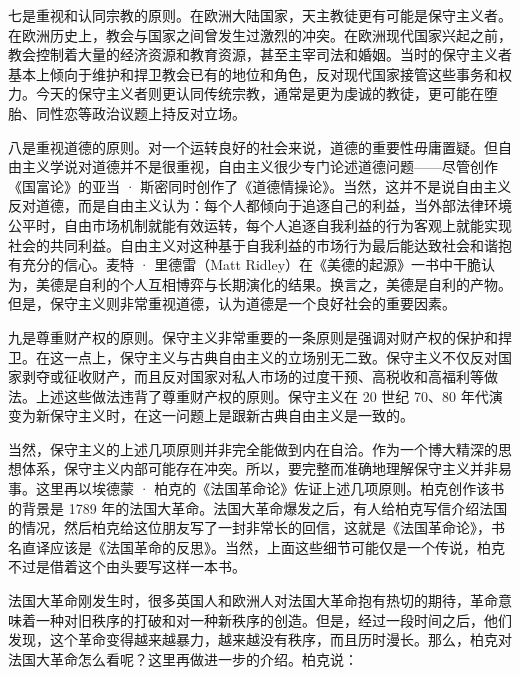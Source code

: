 七是重视和认同宗教的原则。在欧洲大陆国家，天主教徒更有可能是保守主义者。在欧洲历史上，教会与国家之间曾发生过激烈的冲突。在欧洲现代国家兴起之前，教会控制着大量的经济资源和教育资源，甚至主宰司法和婚姻。当时的保守主义者基本上倾向于维护和捍卫教会已有的地位和角色，反对现代国家接管这些事务和权力。今天的保守主义者则更认同传统宗教，通常是更为虔诚的教徒，更可能在堕胎、同性恋等政治议题上持反对立场。

八是重视道德的原则。对一个运转良好的社会来说，道德的重要性毋庸置疑。但自由主义学说对道德并不是很重视，自由主义很少专门论述道德问题——尽管创作《国富论》的亚当 · 斯密同时创作了《道德情操论》。当然，这并不是说自由主义反对道德，而是自由主义认为：每个人都倾向于追逐自己的利益，当外部法律环境公平时，自由市场机制就能有效运转，每个人追逐自我利益的行为客观上就能实现社会的共同利益。自由主义对这种基于自我利益的市场行为最后能达致社会和谐抱有充分的信心。麦特 · 里德雷（Matt Ridley）在《美德的起源》一书中干脆认为，美德是自利的个人互相博弈与长期演化的结果。换言之，美德是自利的产物。但是，保守主义则非常重视道德，认为道德是一个良好社会的重要因素。

九是尊重财产权的原则。保守主义非常重要的一条原则是强调对财产权的保护和捍卫。在这一点上，保守主义与古典自由主义的立场别无二致。保守主义不仅反对国家剥夺或征收财产，而且反对国家对私人市场的过度干预、高税收和高福利等做法。上述这些做法违背了尊重财产权的原则。保守主义在 20 世纪 70、80 年代演变为新保守主义时，在这一问题上是跟新古典自由主义是一致的。

当然，保守主义的上述几项原则并非完全能做到内在自洽。作为一个博大精深的思想体系，保守主义内部可能存在冲突。所以，要完整而准确地理解保守主义并非易事。这里再以埃德蒙 · 柏克的《法国革命论》佐证上述几项原则。柏克创作该书的背景是 1789 年的法国大革命。法国大革命爆发之后，有人给柏克写信介绍法国的情况，然后柏克给这位朋友写了一封非常长的回信，这就是《法国革命论》，书名直译应该是《法国革命的反思》。当然，上面这些细节可能仅是一个传说，柏克不过是借着这个由头要写这样一本书。

法国大革命刚发生时，很多英国人和欧洲人对法国大革命抱有热切的期待，革命意味着一种对旧秩序的打破和对一种新秩序的创造。但是，经过一段时间之后，他们发现，这个革命变得越来越暴力，越来越没有秩序，而且历时漫长。那么，柏克对法国大革命怎么看呢？这里再做进一步的介绍。柏克说：


